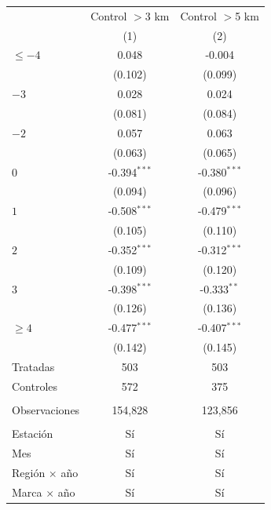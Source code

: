
\begingroup
\centering
\begin{tabular}{lcc}
   \toprule
                        & Control $>$3 km & Control $>$5 km \\   
                        & (1)             & (2)\\  
   \midrule 
   $\leq -4$            & 0.048           & -0.004\\   
                        & (0.102)         & (0.099)\\   
   $-3$                 & 0.028           & 0.024\\   
                        & (0.081)         & (0.084)\\   
   $-2$                 & 0.057           & 0.063\\   
                        & (0.063)         & (0.065)\\   
   $0$                  & -0.394$^{***}$  & -0.380$^{***}$\\   
                        & (0.094)         & (0.096)\\   
   $1$                  & -0.508$^{***}$  & -0.479$^{***}$\\   
                        & (0.105)         & (0.110)\\   
   $2$                  & -0.352$^{***}$  & -0.312$^{***}$\\   
                        & (0.109)         & (0.120)\\   
   $3$                  & -0.398$^{***}$  & -0.333$^{**}$\\   
                        & (0.126)         & (0.136)\\   
   $\geq 4$             & -0.477$^{***}$  & -0.407$^{***}$\\   
                        & (0.142)         & (0.145)\\   
   Tratadas             & 503             & 503\\  
   Controles            & 572             & 375\\  
    \\
   Observaciones        & 154,828         & 123,856\\  
    \\
   Estación             & Sí              & Sí\\  
   Mes                  & Sí              & Sí\\  
   Región $\times$ año  & Sí              & Sí\\  
   Marca $\times$ año   & Sí              & Sí\\  
   \bottomrule
\end{tabular}
\par\endgroup


